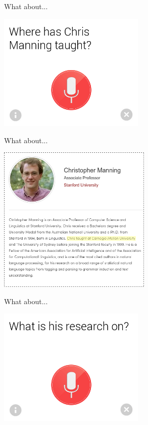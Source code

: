 \def\title{What about...}
\begin{frame}{\title}
\begin{center}
  \includegraphics[width=7cm]{../../img/google-chris-manning-taught.png}
\end{center}
\end{frame}
\begin{frame}[noframenumbering]{\title}
\begin{center}
  \includegraphics[height=7cm]{../../img/chris-coursera-taught.png} \\
\end{center}
\end{frame}
\begin{frame}[noframenumbering]{\title}
\begin{center}
  \includegraphics[width=7cm]{../../img/google-chris-manning-research.png}
\end{center}
\end{frame}
